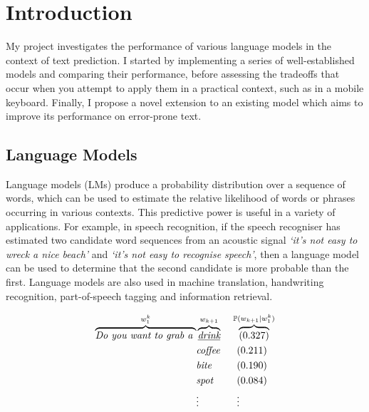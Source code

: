 \documentclass[a4paper, 12pt]{report}
\newcommand{\tit}[1]{\textit{#1}}
\begin{document}
\tableofcontents

\listoffigures



\pagestyle{headings}

\chapter{Introduction}

My project investigates the performance of various language models in the context of text prediction. I started by implementing a series of well-established models and comparing their performance, before assessing the tradeoffs that occur when you attempt to apply them in a practical context, such as in a mobile keyboard. Finally, I propose a novel extension to an existing model which aims to improve its performance on error-prone text.

\section{Language Models}

Language models (LMs) produce a probability distribution over a sequence of words, which can be used to estimate the relative likelihood of words or phrases occurring in various contexts. This predictive power is useful in a variety of applications. For example, in speech recognition, if the speech recogniser has estimated two candidate word sequences from an acoustic signal \tit{`it's not easy to wreck a nice beach'} and \tit{`it's not easy to recognise speech'}, then a language model can be used to determine that the second candidate is more probable than the first. Language models are also used in machine translation, handwriting recognition, part-of-speech tagging and information retrieval.

\begin{alignat*}{2}
	\overbrace{\tit{Do you want to grab a }}^{w_1^k}&\overbrace{\underline{\tit{drink}}}^{w_{k+1}} &&\hspace{0.5mm}\overbrace{(0.327)}^{\mathbb{P}(w_{k + 1} | w_1^k)} \\
	&\tit{coffee} &&\ \ (0.211) \\
	&\tit{bite} &&\ \ (0.190) \\
	&\tit{spot} &&\ \ (0.084) \\
	&\vdots &&\ \ \vdots
\end{alignat*}
\end{document}
